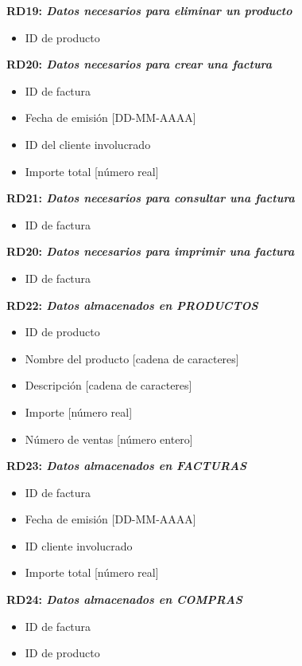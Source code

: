 \documentclass[paper=a4, fontsize=11pt, spanish]{scrartcl}
\begin{document}
\setlength{\parindent}{0em}
\textbf{RD19: \textit{Datos necesarios para eliminar un producto}}
\setlength{\parindent}{2em}
\begin{itemize}
	\item ID de producto
\end{itemize}

\setlength{\parindent}{0em}
\textbf{RD20: \textit{Datos necesarios para crear una factura}}
\setlength{\parindent}{2em}
\begin{itemize}
	\item ID de factura
	\item Fecha de emisión [DD-MM-AAAA]
	\item ID del cliente involucrado
	\item Importe total [número real]
\end{itemize}

\setlength{\parindent}{0em}
\textbf{RD21: \textit{Datos necesarios para consultar una factura}}
\setlength{\parindent}{2em}
\begin{itemize}
	\item ID de factura
\end{itemize}

\setlength{\parindent}{0em}
\textbf{RD20: \textit{Datos necesarios para imprimir una factura}}
\setlength{\parindent}{2em}
\begin{itemize}
	\item ID de factura
\end{itemize}

\setlength{\parindent}{0em}
\textbf{RD22: \textit{Datos almacenados en PRODUCTOS}}
\setlength{\parindent}{2em}
\begin{itemize}
	\item ID de producto
	\item Nombre del producto [cadena de caracteres]
	\item Descripción [cadena de caracteres]
	\item Importe [número real]
	\item Número de ventas [número entero]
\end{itemize}

\setlength{\parindent}{0em}
\textbf{RD23: \textit{Datos almacenados en FACTURAS}}
\setlength{\parindent}{2em}
\begin{itemize}
	\item ID de factura
	\item Fecha de emisión [DD-MM-AAAA]
	\item ID cliente involucrado
	\item Importe total [número real]
\end{itemize}

\setlength{\parindent}{0em}
\textbf{RD24: \textit{Datos almacenados en COMPRAS}}
\setlength{\parindent}{2em}
\begin{itemize}
	\item ID de factura
	\item ID de producto
\end{itemize}
\end{document}
